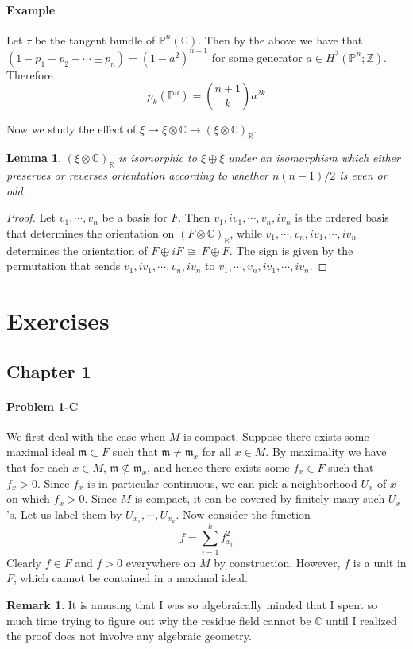 \documentclass[12pt]{article}
\theoremstyle{plain}
\newtheorem{lemma}[equation]{Lemma}
\theoremstyle{definition}
\newtheorem{remark}[equation]{Remark}
\newcommand{\IC}{\mathbb{C}}
\newcommand{\IP}{\mathbb{P}}
\newcommand{\IR}{\mathbb{R}}
\newcommand{\IZ}{\mathbb{Z}}
\newcommand\iso{\,{\cong}\,}
\newcommand\tensor{{\otimes}}
\newcommand{\<}{\langle}
\renewcommand{\>}{\rangle}
\newcommand{\fm}{\mathfrak{m}}
\begin{document}
\paragraph{Example} Let $\tau$ be the tangent bundle of $\IP^n(\IC)$. Then by the above we have that $(1 - p_1 + p_2 - \cdots \pm p_n ) = (1 - a^2)^{n + 1}$ for some generator $a \in H^2(\IP^n; \IZ)$. Therefore
$$ p_k(\IP^n) = { n + 1 \choose k } a^{2k} $$

Now we study the effect of $\xi \to \xi \tensor \IC \to (\xi \tensor \IC)_\IR$. 

\begin{lemma}
$( \xi \tensor \IC)_\IR$ is isomorphic to $\xi \oplus \xi$ under an isomorphism which either preserves or reverses orientation according to whether $n(n-1)/2$ is even or odd. 
\end{lemma}
\begin{proof}
Let $v_1, \cdots, v_n$ be a basis for $F$. Then $v_1, iv_1, \cdots, v_n, iv_n$ is the ordered basis that determines the orientation on $(F \tensor \IC)_\IR$, while $v_1, \cdots, v_n, iv_1, \cdots, iv_n$ determines the orientation of $F \oplus iF \iso F \oplus F$. The sign is given by the permutation that sends $v_1, iv_1, \cdots, v_n, iv_n$ to $v_1, \cdots, v_n, iv_1, \cdots, iv_n$. 
\end{proof}




\section{Exercises}
\subsection*{Chapter 1}

\paragraph{Problem 1-C} We first deal with the case when $M$ is compact. Suppose there exists some maximal ideal $\fm \subset F$ such that $\fm \neq \fm_x$ for all $x \in M$. By maximality we have that for each $x \in M$, $\fm \not\subseteq \fm_x$, and hence there exists some $f_x \in F$ such that $f_x > 0$. Since $f_x$ is in particular continuous, we can pick a neighborhood $U_x$ of $x$ on which $f_x > 0$. Since $M$ is compact, it can be covered by finitely many such $U_x$'s. Let us label them by $U_{x_1}, \cdots, U_{x_k}$. Now consider the function $$f = \sum_{i = 1}^k f_{x_i}^2 $$
Clearly $f \in F$ and $f > 0$ everywhere on $M$ by construction. However, $f$ is a unit in $F$, which cannot be contained in a maximal ideal. 
\begin{remark}
It is amusing that I was so algebraically minded that I spent so much time trying to figure out why the residue field cannot be $\IC$ until I realized the proof does not involve any algebraic geometry. 
\end{remark}
\end{document}
